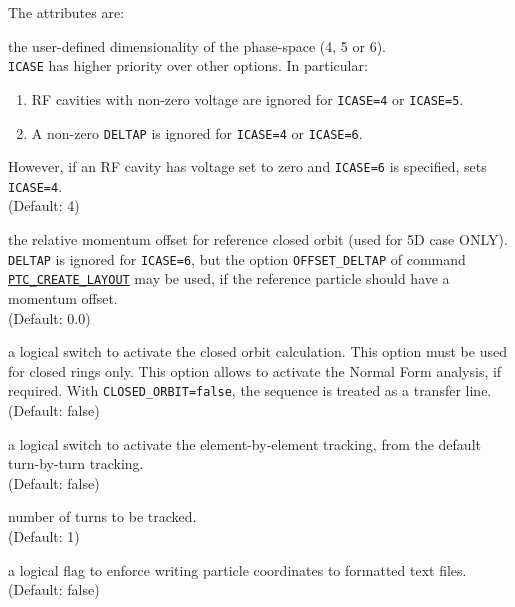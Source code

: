 The attributes are: 
\begin{madlist}
  
   the user-defined dimensionality of the phase-space 
  (4, 5 or 6). \\ 
  \texttt{ICASE} has higher priority over other options. In particular:
  \begin{enumerate}
    \item RF cavities with non-zero voltage are ignored for
      \texttt{ICASE=4} or \texttt{ICASE=5}.
    \item A non-zero \texttt{DELTAP} is ignored for \texttt{ICASE=4} or \texttt{ICASE=6}.
  \end{enumerate}
  However, if an RF cavity has voltage set to zero and \texttt{ICASE=6} is
  specified, \ptc sets \texttt{ICASE=4}.
  \\(Default: 4)

    the relative momentum offset for reference closed
   orbit (used for 5D case ONLY). \\
   \texttt{DELTAP} is ignored for \texttt{ICASE=6}, but the option 
   \texttt{OFFSET\_DELTAP} of command \hyperref[sec:ptc-create-layout]{
   \texttt{PTC\_CREATE\_LAYOUT}} may be used, if the reference particle should
   have a momentum offset. \\ 
   (Default: 0.0) 

   \label{opt:closed-orbit}
   a logical switch to activate the closed orbit calculation.
   This option must be used for closed rings only. This
   option allows to activate the Normal Form analysis, if
   required. With \texttt{CLOSED\_ORBIT=false}, the sequence is treated as
   a transfer line. \\ (Default: false)
     
   \label{opt:element-by-element}
   a logical switch to activate the element-by-element tracking, from
   the default turn-by-turn tracking. \\ (Default: false)

    number of turns to be tracked. \\ (Default: 1)

    a logical flag to enforce writing particle coordinates
   to formatted text files. \\
   (Default: false)


\end{madlist}

